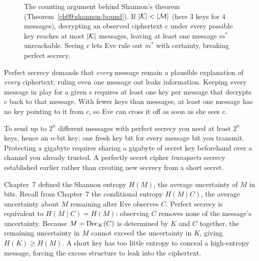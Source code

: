 \begin{figure}[htbp]
\caption{The counting argument behind Shannon's theorem (Theorem~\ref{ch09:shannon-bound}). If $\lvert\mathcal{K}\rvert < \lvert\mathcal{M}\rvert$ (here $3$ keys for $4$ messages), decrypting an observed ciphertext $c$ under every possible key reaches at most $\lvert\mathcal{K}\rvert$ messages, leaving at least one message $m^*$ unreachable. Seeing $c$ lets Eve rule out $m^*$ with certainty, breaking perfect secrecy.}
\label{ch09:fig-shannon-bound}
\end{figure}

\begin{intuitionbox}
Perfect secrecy demands that \emph{every} message remain a plausible explanation of \emph{every} ciphertext; ruling even one message out leaks information. Keeping every message in play for a given $c$ requires at least one key per message that decrypts $c$ back to that message. With fewer keys than messages, at least one message has no key pointing to it from $c$, so Eve can cross it off as soon as she sees $c$.
\end{intuitionbox}

\begin{focusbox}
To send up to $2^n$ different messages with perfect secrecy you need at least $2^n$ keys, hence an $n$-bit key: one fresh key bit for every message bit you transmit. Protecting a gigabyte requires sharing a gigabyte of secret key beforehand over a channel you already trusted. A perfectly secret cipher \emph{transports} secrecy established earlier rather than creating new secrecy from a short secret.
\end{focusbox}

\begin{connectionbox}
Chapter~7 defined the Shannon entropy $H(M)$, the average uncertainty of $M$ in bits. Recall from Chapter~7 the conditional entropy $H(M \mid C)$, the average uncertainty about $M$ remaining after Eve observes $C$. Perfect secrecy is equivalent to $H(M \mid C) = H(M)$: observing $C$ removes none of the message's uncertainty. Because $M = \operatorname{Dec}_K(C)$ is determined by $K$ and $C$ together, the remaining uncertainty in $M$ cannot exceed the uncertainty in $K$, giving $H(K) \ge H(M)$. A short key has too little entropy to conceal a high-entropy message, forcing the excess structure to leak into the ciphertext.
\end{connectionbox}

